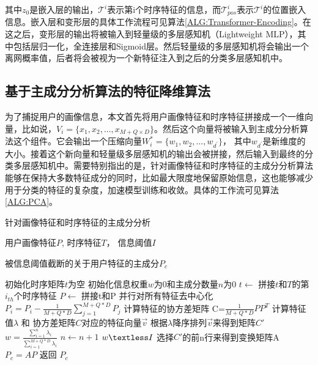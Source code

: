 其中$z_{0}$是嵌入层的输出，$\mathcal{T}^{i}$表示第i个时序特征的信息，而$\mathcal{T}^{i}_{pos}$表示$\mathcal{T}^{i}$的位置嵌入信息。嵌入层和变形层的具体工作流程可见算法\ref{ALG:Transformer-Encoding}。在这之后，变形层的输出将被输入到轻量级的多层感知机（Lightweight MLP），其中包括层归一化，全连接层和Sigmoid层。然后轻量级的多层感知机将会输出一个离网概率值，后者将会被视为一个新特征注入到之后的分类多层感知机中。

\subsection{基于主成分分析算法的特征降维算法}
为了捕捉用户的画像信息，本文首先将用户画像特征和时序特征拼接成一个一维向量，比如说，$V_{i} = \{x_{1}, x_{2}, ..., x_{M+Q \times D}  \}$。然后这个向量将被输入到主成分分析算法这个组件。它会输出一个压缩向量$ W_{i}^{*} = \{ w_{1}, w_{2}, ..., w_{d^{'}} \} $， 其中$w_{d^{'}}$是新维度的大小。接着这个新向量和轻量级多层感知机的输出会被拼接，然后输入到最终的分类多层感知机中。需要特别指出的是，针对画像特征和时序特征的主成分分析算法能够在保持大多数特征成分的同时，比如最大限度地保留原始信息，这也能够减少用于分类的特征的复杂度，加速模型训练和收敛。具体的工作流可见算法\ref{ALG:PCA}。
\begin{algorithm}
	\caption{针对画像特征和时序特征的主成分分析}
	\label{ALG:PCA}
	\renewcommand{\algorithmicrequire}{\textbf{Input:}}
	\renewcommand{\algorithmicensure}{\textbf{Output:}}
	
	\begin{algorithmic}[1]
		\REQUIRE 用户画像特征$P$, 时序特征$T$， 信息阈值$I$
		
		\ENSURE 被信息阈值截断的关于用户特征的主成分$P_{c}$
		
		\STATE 初始化时序矩阵$t$为空
		\STATE 初始化信息权重$w$为0和主成分数量$n$为0
		\STATE $t \gets$ 拼接$t$和$T$的第$i_{th}$个时序特征
		\ENDFOR
		\STATE $P \gets$ 拼接t和P
		\STATE 并行对所有特征去中心化 $P_i =P_i - \frac{1}{M+Q*D} \sum_{j=1}^{M+Q*D} P_j$
		\STATE 计算特征的协方差矩阵 C=$\frac{1}{M+Q*D}PP^T$
		\STATE 计算特征值$\lambda$ 和 协方差矩阵$C$对应的特征向量$\vec v$
		\STATE 根据$\lambda$降序排列$\vec v$来得到矩阵$C'$
		\REPEAT
		\STATE $w=\frac{\sum_{i=1}^{n}\lambda_i}{\sum_{i=1}^{M+Q*D}\lambda_i}$
		\STATE $n\gets n+1$
		\UNTIL $w \textless I$
		\STATE 选择$C'$的前n行来得到变换矩阵A
		\STATE $P_c = AP$
		\STATE 返回 $P_c$
	\end{algorithmic}
\end{algorithm}

